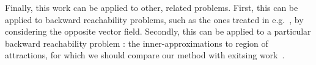 \documentclass{sig-alternate-05-2015} %
\begin{document}

Finally, this work can be applied to other, related problems. First, this can be applied
to backward reachability problems, such as the ones treated in e.g.~\cite{underapprox16}, by considering
the opposite vector field. Secondly, this can be applied to a particular backward 
reachability problem : the inner-approximations to region
of attractions, for which we should compare our method with exitsing work~\cite{DBLP:conf/nolcos/KordaHJ13}. 



\end{document}
